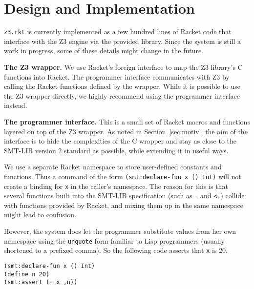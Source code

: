 \section{Design and Implementation}

\texttt{z3.rkt} is currently implemented as a few hundred lines of Racket code
that interface with the Z3 engine via the provided library. Since the system is
still a work in progress, some of these details might change in the future.

\textbf{The Z3 wrapper.} We use Racket's foreign interface \cite{racket/foreign}
to map the Z3 library's C functions into Racket. The programmer interface
communicates with Z3 by calling the Racket functions defined by the
wrapper. While it is possible to use the Z3 wrapper directly, we highly
recommend using the programmer interface instead.

\textbf{The programmer interface.} This is a small set of Racket macros and
functions layered on top of the Z3 wrapper. As noted in Section~\ref{sec:motiv},
the aim of the interface is to hide the complexities of the C wrapper and stay
as close to the SMT-LIB version 2 standard \cite{smtlib2:10} as possible, while
extending it in useful ways.

We use a separate Racket namespace to store user-defined
constants and functions. Thus a command of the form
\texttt{(smt:declare-fun x () Int)} will not create a binding
for \texttt{x} in the caller's namespace. The reason for this
is that several functions built into the SMT-LIB
specification (such as \texttt{=} and \texttt{<=}) collide
with functions provided by Racket, and mixing them up in the
same namespace might lead to confusion.

However, the system does let the programmer substitute values from her own
namespace using the \texttt{unquote} form familiar to Lisp programmers (usually
shortened to a prefixed comma). So the following code asserts that \texttt{x} is
20.

\begin{verbatim}
(smt:declare-fun x () Int)
(define n 20)
(smt:assert (= x ,n))
\end{verbatim} 

